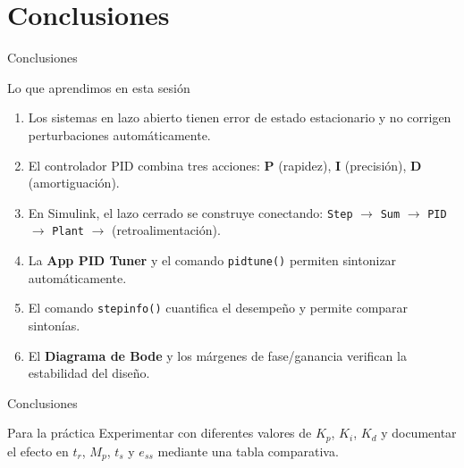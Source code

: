 \documentclass[aspectratio=169,xcolor=dvipsnames]{beamer}
\begin{document}
\section{Conclusiones}

\begin{frame}{Conclusiones}
    \footnotesize
    \begin{block}{Lo que aprendimos en esta sesión}
        \begin{enumerate}
            \item Los sistemas en lazo abierto tienen error de estado estacionario y no corrigen perturbaciones automáticamente.
            \item El controlador PID combina tres acciones: \textbf{P} (rapidez), \textbf{I} (precisión), \textbf{D} (amortiguación).
            \item En Simulink, el lazo cerrado se construye conectando: \texttt{Step} $\rightarrow$ \texttt{Sum} $\rightarrow$ \texttt{PID} $\rightarrow$ \texttt{Plant} $\rightarrow$ (retroalimentación).
            \item La \textbf{App PID Tuner} y el comando \texttt{pidtune()} permiten sintonizar automáticamente.
            \item El comando \texttt{stepinfo()} cuantifica el desempeño y permite comparar sintonías.
            \item El \textbf{Diagrama de Bode} y los márgenes de fase/ganancia verifican la estabilidad del diseño.
        \end{enumerate}
    \end{block}
\end{frame}
\begin{frame}{Conclusiones}

    \begin{alertblock}{Para la práctica}
        Experimentar con diferentes valores de $K_p$, $K_i$, $K_d$ y documentar el efecto en $t_r$, $M_p$, $t_s$ y $e_{ss}$ mediante una tabla comparativa.
    \end{alertblock}
\end{frame}
\end{document}
